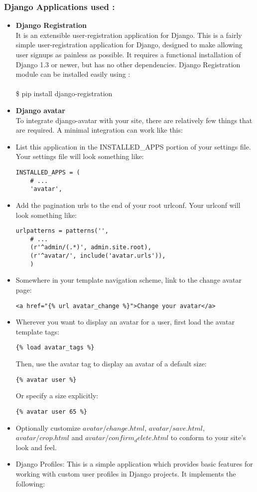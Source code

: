\subsubsection{Django Applications used :}
\begin{itemize}
\item {\bf Django Registration}\\
It is an extensible user-registration application for Django. This is a fairly simple user-registration application for Django, designed to make allowing user signups as painless as possible. It requires a functional installation of Django 1.3 or newer, but has no other dependencies. Django Registration module can be installed easily using :\\\\
\$ pip install django-registration\\
\item {\bf Django avatar}\\
To integrate django-avatar with your site, there are relatively few things that are required. A minimal integration can work like this:
\item List this application in the INSTALLED\_APPS portion of your settings file. Your settings file will look something like:
\begin{verbatim}
INSTALLED_APPS = (
    # ...
    'avatar',
\end{verbatim}
\item Add the pagination urls to the end of your root urlconf. Your urlconf will look something like:
\begin{verbatim}
urlpatterns = patterns('',
    # ...
    (r'^admin/(.*)', admin.site.root),
    (r'^avatar/', include('avatar.urls')),
	)
\end{verbatim}        
\item Somewhere in your template navigation scheme, link to the change avatar page:
\begin{verbatim}
<a href="{% url avatar_change %}">Change your avatar</a>
\end{verbatim}
\item Wherever you want to display an avatar for a user, first load the avatar template tags:
\begin{verbatim}
{% load avatar_tags %}
\end{verbatim}
Then, use the avatar tag to display an avatar of a default size:
\begin{verbatim}
{% avatar user %}
\end{verbatim}
Or specify a size explicitly:
\begin{verbatim}
{% avatar user 65 %}
\end{verbatim}
\item Optionally customize $avatar/change.html$, $avatar/save.html$, $avatar/crop.html$ and $avatar/confirm_delete.html$ to conform to your site's look and feel.
\item {Django Profiles}: This is a simple application which provides basic features for working with custom user profiles in Django projects. It implements the following:
\end{itemize}
